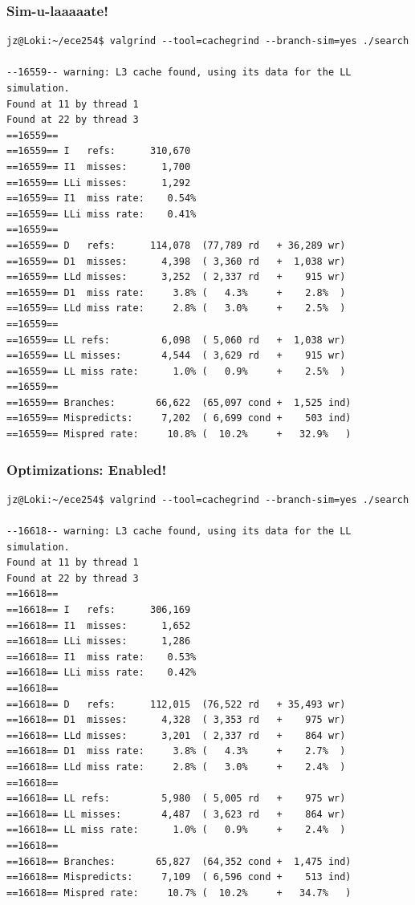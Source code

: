 \begin{frame}[fragile]
\frametitle{Sim-u-laaaaate!}
{\scriptsize

\begin{verbatim}
jz@Loki:~/ece254$ valgrind --tool=cachegrind --branch-sim=yes ./search

--16559-- warning: L3 cache found, using its data for the LL simulation.
Found at 11 by thread 1 
Found at 22 by thread 3 
==16559== 
==16559== I   refs:      310,670
==16559== I1  misses:      1,700
==16559== LLi misses:      1,292
==16559== I1  miss rate:    0.54%
==16559== LLi miss rate:    0.41%
==16559== 
==16559== D   refs:      114,078  (77,789 rd   + 36,289 wr)
==16559== D1  misses:      4,398  ( 3,360 rd   +  1,038 wr)
==16559== LLd misses:      3,252  ( 2,337 rd   +    915 wr)
==16559== D1  miss rate:     3.8% (   4.3%     +    2.8%  )
==16559== LLd miss rate:     2.8% (   3.0%     +    2.5%  )
==16559== 
==16559== LL refs:         6,098  ( 5,060 rd   +  1,038 wr)
==16559== LL misses:       4,544  ( 3,629 rd   +    915 wr)
==16559== LL miss rate:      1.0% (   0.9%     +    2.5%  )
==16559== 
==16559== Branches:       66,622  (65,097 cond +  1,525 ind)
==16559== Mispredicts:     7,202  ( 6,699 cond +    503 ind)
==16559== Mispred rate:     10.8% (  10.2%     +   32.9%   )

\end{verbatim}
}

\end{frame}

\begin{frame}[fragile]
\frametitle{Optimizations: Enabled!}
{\scriptsize
\begin{verbatim}
jz@Loki:~/ece254$ valgrind --tool=cachegrind --branch-sim=yes ./search

--16618-- warning: L3 cache found, using its data for the LL simulation.
Found at 11 by thread 1 
Found at 22 by thread 3 
==16618== 
==16618== I   refs:      306,169
==16618== I1  misses:      1,652
==16618== LLi misses:      1,286
==16618== I1  miss rate:    0.53%
==16618== LLi miss rate:    0.42%
==16618== 
==16618== D   refs:      112,015  (76,522 rd   + 35,493 wr)
==16618== D1  misses:      4,328  ( 3,353 rd   +    975 wr)
==16618== LLd misses:      3,201  ( 2,337 rd   +    864 wr)
==16618== D1  miss rate:     3.8% (   4.3%     +    2.7%  )
==16618== LLd miss rate:     2.8% (   3.0%     +    2.4%  )
==16618== 
==16618== LL refs:         5,980  ( 5,005 rd   +    975 wr)
==16618== LL misses:       4,487  ( 3,623 rd   +    864 wr)
==16618== LL miss rate:      1.0% (   0.9%     +    2.4%  )
==16618== 
==16618== Branches:       65,827  (64,352 cond +  1,475 ind)
==16618== Mispredicts:     7,109  ( 6,596 cond +    513 ind)
==16618== Mispred rate:     10.7% (  10.2%     +   34.7%   )
\end{verbatim}
}

\end{frame}

